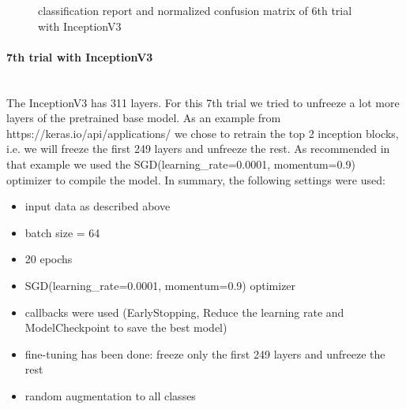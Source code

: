 \documentclass{article}
\begin{document}
\begin{figure}%
  \centering
  \qquad
  \caption{classification report and normalized confusion matrix of 6th trial with InceptionV3}
  \label{fig:inceptionv3_09_results}
\end{figure}

\paragraph{7th trial with InceptionV3}\mbox{}\\

The InceptionV3 has 311 layers. For this 7th trial we tried to unfreeze a lot more layers of the pretrained base model. As an example from https://keras.io/api/applications/ we chose to retrain the top 2 inception blocks, i.e. we will freeze the first 249 layers and unfreeze the rest. As recommended in that example we used the SGD(learning\_rate=0.0001, momentum=0.9) optimizer to compile the model. In summary, the following settings were used: 
\begin{itemize}
\item input data as described above
\item batch size = 64
\item 20 epochs 
\item SGD(learning\_rate=0.0001, momentum=0.9) optimizer
\item callbacks were used (EarlyStopping, Reduce the learning rate and ModelCheckpoint to save the best model)
\item fine-tuning has been done: freeze only the first 249 layers and unfreeze the rest
\item random augmentation to all classes 
\end{itemize}
\end{document}
